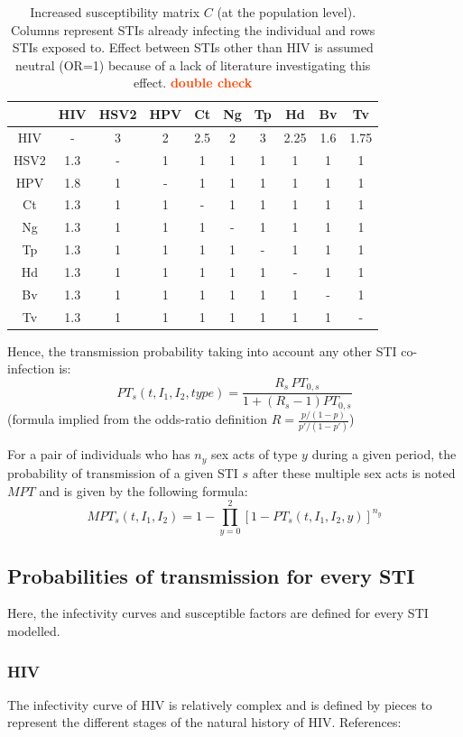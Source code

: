 \documentclass[11pt, onecolumn]{article}
\newcommand{\warning}[1]{\textbf{\textcolor{OrangeRed}{#1}}}
\begin{document}
\begin{table}[htdp]
\begin{center}
\begin{tabular}{|c|c|c|c|c|c|c|c|c|c|}
\hline
&HIV&HSV2&HPV&Ct&Ng&Tp&Hd&Bv&Tv\\
\hline
HIV&-&3&2&2.5&2&3&2.25&1.6&1.75\\
HSV2&1.3&-&1&1&1&1&1&1&1\\
HPV&1.8&1&-&1&1&1&1&1&1\\
Ct&1.3&1&1&-&1&1&1&1&1\\
Ng&1.3&1&1&1&-&1&1&1&1\\
Tp&1.3&1&1&1&1&-&1&1&1\\
Hd&1.3&1&1&1&1&1&-&1&1\\
Bv&1.3&1&1&1&1&1&1&-&1\\
Tv&1.3&1&1&1&1&1&1&1&-\\
\hline
\end{tabular}
\end{center}
\caption{Increased susceptibility matrix $C$ (at the population level). Columns represent STIs already infecting the individual and rows STIs exposed to. Effect between STIs other than HIV is assumed neutral (OR=1) because of a lack of literature investigating this effect. \warning{double check}}
\label{default}
\end{table}%

Hence, the transmission probability taking into account any other STI co-infection is:
$$PT_s(t,I_1,I_2,type) =\frac{R_s\,  PT_{0,s} }{1+ (R_s-1)PT_{0,s} }$$
(formula implied from the odds-ratio definition $R=\frac{p/(1-p)}{p'/(1-p')}$)

For a pair of individuals who has $n_{y}$ sex acts of type $y$ during a given period, the probability of transmission of a given STI $s$ after these multiple sex acts is noted $MPT$ and is given by the following formula:
$$ MPT_s(t,I_1,I_2) = 1- \prod_{y=0}^{2}[1-PT_s(t,I_1,I_2,y)]^{n_y} $$


\subsection{Probabilities of transmission for every STI}
\label{sec:probaTransmission}
Here, the infectivity curves and susceptible factors are defined for every STI modelled.

\subsubsection{HIV}
The infectivity curve of HIV is relatively complex and is defined by pieces to represent the different stages of the natural history of HIV. References: \cite{Pilcher:2007wr}
\end{document}
